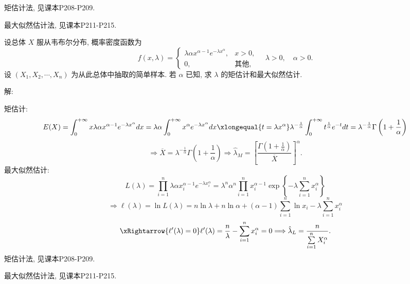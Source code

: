 \documentclass[standard]{ExBook}
\renewenvironment{shaded}{%
  \def\FrameCommand{\fboxsep=\FrameSep \colorbox{shadecolor}}%
  \MakeFramed{\advance\hsize-\width \FrameRestore}%
}{%
  \endMakeFramed
}
\begin{document}
\begin{qitems}
\textcolor{themeColor}{\selectfont {} 矩估计法, 见课本P208-P209.}

\textcolor{themeColor}{\selectfont {} 最大似然估计法, 见课本P211-P215.}

\vspace{2.5cm-5em}

    \begin{bbox}
    \begin{shaded}
        \qitem
设总体 \( X \) 服从韦布尔分布, 概率密度函数为
\[f(x, \lambda) =
\begin{cases}
\lambda \alpha x^{\alpha-1} e^{-\lambda x^\alpha}, & x > 0, \\
0, & \text{其他},
\end{cases}
\quad \lambda > 0, \quad \alpha > 0.\]
设 \( (X_1, X_2, \cdots, X_n) \) 为从此总体中抽取的简单样本. 若 \( \alpha \) 已知, 求 \( \lambda \) 的矩估计和最大似然估计.
    \end{shaded}
    \end{bbox}

\vspace{\dimexpr2.5cm-5em\relax}

解:

 矩估计:
$$
E(X)
=\int_{0}^{+\infty}x\lambda\alpha x^{\alpha-1}e^{-\lambda x^\alpha}dx
=\lambda\alpha\int_{0}^{+\infty}x^\alpha e^{-\lambda x^\alpha}dx
\xlongequal{t=\lambda x^\alpha}
\lambda^{-\frac{1}{\alpha}}
\int_{0}^{+\infty}t^{\frac{1}{\alpha}}e^{-t}dt
=\lambda^{-\frac{1}{\alpha}}\Gamma\left(1+\frac{1}{\alpha}\right)
$$
$$
\Longrightarrow
\overline{X}
=\lambda^{-\frac{1}{\alpha}}\Gamma\left(1+\frac{1}{\alpha}\right)
\Longrightarrow
\hat{\lambda}_{M}
=
\left[
\frac{\Gamma\left(1+\frac{1}{\alpha}\right)}{\overline{X}}
\right]^{\alpha}.
$$
 最大似然估计:
$$
L(\lambda)
=\prod_{i=1}^{n}\lambda\alpha x_i^{\alpha-1}e^{-\lambda x_i^\alpha}
=\lambda^n\alpha^n\prod_{i=1}^{n}x_i^{\alpha-1}
\exp\left\{-\lambda\sum_{i=1}^{n}x_i^\alpha\right\}
$$
$$
\Longrightarrow
\ell(\lambda)
=\ln L(\lambda)
=n\ln\lambda+n\ln\alpha+(\alpha-1)\sum_{i=1}^{n}\ln x_i
-\lambda\sum_{i=1}^{n}x_i^\alpha
$$
$$
\xRightarrow{\ell'(\lambda)=0}
\ell'(\lambda)
=\frac{n}{\lambda}-\sum_{i=1}^{n}x_i^\alpha=0
\Longrightarrow
\hat{\lambda}_{L}
=\frac{n}{\sum\limits_{i=1}^{n}X_i^\alpha}.
$$
\textcolor{themeColor}{\selectfont {} 矩估计法, 见课本P208-P209.}

\textcolor{themeColor}{\selectfont {} 最大似然估计法, 见课本P211-P215.}

\vspace{2.5cm-5em}


\end{qitems}
\end{document}
